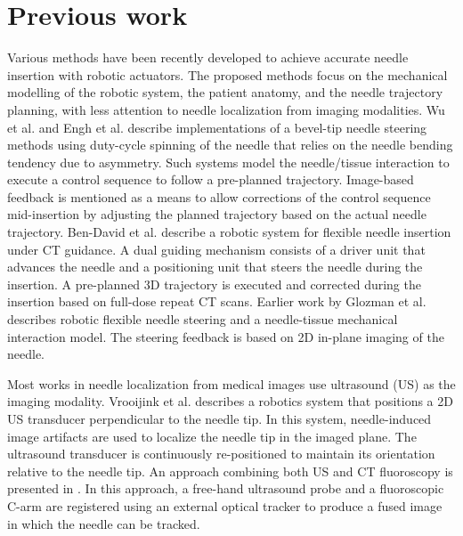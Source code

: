 \section*{Previous work}
Various methods have been recently developed to achieve accurate needle insertion with robotic actuators. The proposed methods focus on the mechanical modelling of the robotic system, the patient anatomy, and the needle trajectory planning, with less attention to needle localization from imaging modalities.
Wu et al. \cite{wu2013automatic} and Engh et al. \cite{engh2010percutaneous} describe implementations of a bevel-tip needle steering methods using duty-cycle spinning of the needle that relies on the needle bending tendency due to asymmetry. Such systems model the needle/tissue interaction to execute a control sequence to follow a pre-planned trajectory. Image-based feedback is mentioned as a means to allow corrections of the control sequence mid-insertion by adjusting the planned trajectory based on the actual needle trajectory.
Ben-David et al. \cite{ben2018robotic} describe a robotic system for flexible needle insertion under CT guidance. A dual guiding mechanism consists of a driver unit that advances the needle and a positioning unit that steers the needle during the insertion. A pre-planned 3D trajectory is executed and corrected during the insertion based on full-dose repeat CT scans.
Earlier work by Glozman et al. \cite{glozman2007image} describes robotic flexible needle steering and a needle-tissue mechanical interaction model. The steering feedback is based on 2D in-plane imaging of the needle.

Most works in needle localization from medical images use ultrasound (US) as the imaging modality. Vrooijink et al. \cite{vrooijink2013real} describes a robotics system that positions a 2D US transducer perpendicular to the needle tip. In this system, needle-induced image artifacts are used to localize the needle tip in the imaged plane. The ultrasound transducer is continuously re-positioned to maintain its orientation relative to the needle tip. An approach combining both US and CT fluoroscopy is presented in \cite{marinetto2017integration}. In this approach, a free-hand ultrasound probe and a fluoroscopic C-arm are registered using an external optical tracker to produce a fused image in which the needle can be tracked.

